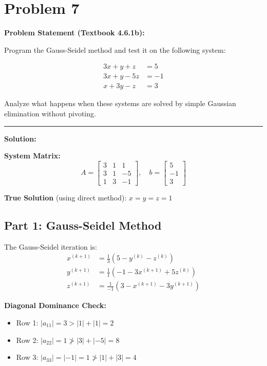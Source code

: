 \clearpage
\section*{Problem 7}

\textbf{Problem Statement (Textbook 4.6.1b):} 

Program the Gauss-Seidel method and test it on the following system:

\begin{align*}
3x + y + z &= 5 \\
3x + y - 5z &= -1 \\
x + 3y - z &= 3
\end{align*}

Analyze what happens when these systems are solved by simple Gaussian elimination without pivoting.

\noindent\rule{\textwidth}{0.4pt}

\vspace{1em}

\textbf{Solution:}

\textbf{System Matrix:}
$$A = \begin{bmatrix} 3 & 1 & 1 \\ 3 & 1 & -5 \\ 1 & 3 & -1 \end{bmatrix}, \quad 
b = \begin{bmatrix} 5 \\ -1 \\ 3 \end{bmatrix}$$

\textbf{True Solution} (using direct method): $\boxed{x = y = z = 1}$

\subsection*{Part 1: Gauss-Seidel Method}

The Gauss-Seidel iteration is:
\begin{align*}
x^{(k+1)} &= \frac{1}{3}(5 - y^{(k)} - z^{(k)}) \\
y^{(k+1)} &= \frac{1}{1}(-1 - 3x^{(k+1)} + 5z^{(k)}) \\
z^{(k+1)} &= \frac{1}{-1}(3 - x^{(k+1)} - 3y^{(k+1)})
\end{align*}

\textbf{Diagonal Dominance Check:}
\begin{itemize}
\item Row 1: $|a_{11}| = 3 > |1| + |1| = 2$
\item Row 2: $|a_{22}| = 1 \not> |3| + |-5| = 8$
\item Row 3: $|a_{33}| = |-1| = 1 \not> |1| + |3| = 4$
\end{itemize}

